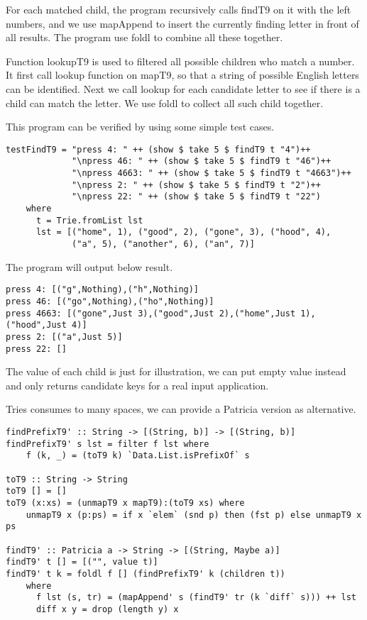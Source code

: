 \documentclass{article}
\begin{document}
For each matched child, the program recursively calls findT9 on it with
the left numbers, and we use mapAppend to insert the currently finding letter
in front of all results. The program use foldl to combine all these together.

Function lookupT9 is used to filtered all possible children who match a
number. It first call lookup function on mapT9, so that a string of possible
English letters can be identified. Next we call lookup for each candidate
letter to see if there is a child can match the letter. We use foldl to 
collect all such child together.

This program can be verified by using some simple test cases.

\begin{lstlisting}
testFindT9 = "press 4: " ++ (show $ take 5 $ findT9 t "4")++
             "\npress 46: " ++ (show $ take 5 $ findT9 t "46")++
             "\npress 4663: " ++ (show $ take 5 $ findT9 t "4663")++
             "\npress 2: " ++ (show $ take 5 $ findT9 t "2")++
             "\npress 22: " ++ (show $ take 5 $ findT9 t "22")
    where
      t = Trie.fromList lst
      lst = [("home", 1), ("good", 2), ("gone", 3), ("hood", 4), 
             ("a", 5), ("another", 6), ("an", 7)]
\end{lstlisting}

The program will output below result.

\begin{verbatim}
press 4: [("g",Nothing),("h",Nothing)]
press 46: [("go",Nothing),("ho",Nothing)]
press 4663: [("gone",Just 3),("good",Just 2),("home",Just 1),("hood",Just 4)]
press 2: [("a",Just 5)]
press 22: []
\end{verbatim}

The value of each child is just for illustration, we can put empty value instead
and only returns candidate keys for a real input application.

Tries consumes to many spaces, we can provide a Patricia version as alternative.

\begin{lstlisting}
findPrefixT9' :: String -> [(String, b)] -> [(String, b)]
findPrefixT9' s lst = filter f lst where
    f (k, _) = (toT9 k) `Data.List.isPrefixOf` s

toT9 :: String -> String
toT9 [] = []
toT9 (x:xs) = (unmapT9 x mapT9):(toT9 xs) where
    unmapT9 x (p:ps) = if x `elem` (snd p) then (fst p) else unmapT9 x ps

findT9' :: Patricia a -> String -> [(String, Maybe a)]
findT9' t [] = [("", value t)]
findT9' t k = foldl f [] (findPrefixT9' k (children t)) 
    where
      f lst (s, tr) = (mapAppend' s (findT9' tr (k `diff` s))) ++ lst
      diff x y = drop (length y) x
\end{lstlisting}
\end{document}
